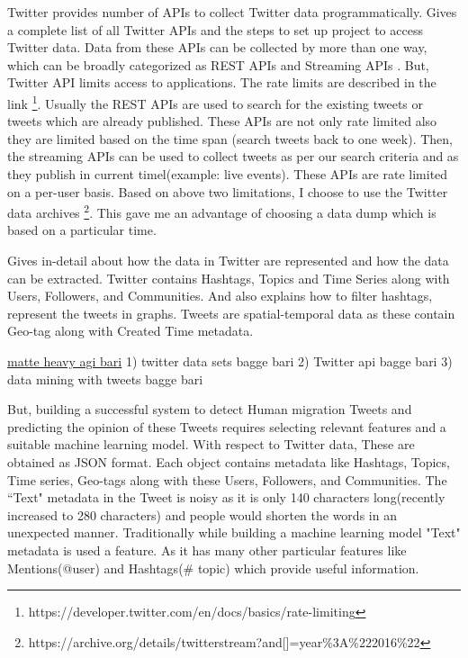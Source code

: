 Twitter provides number of APIs to collect Twitter data programmatically. \cite{TwitterDevDocs} Gives a complete list of all Twitter APIs and the steps to set up project to access Twitter data. Data from these APIs can be collected by more than one way, which can be broadly categorized as REST APIs and Streaming APIs . But, Twitter API limits access to applications. The rate limits are described in the link  \footnote{https://developer.twitter.com/en/docs/basics/rate-limiting}. Usually the REST APIs are used to search for the existing tweets or tweets which are already published. These APIs are not only rate limited also they are limited based on the time span (search tweets back to one week). Then, the streaming APIs can be used to collect tweets as per our search criteria and as they publish in current timel(example: live events). These APIs are rate limited on a per-user basis. Based on above two limitations, I choose to use the Twitter data archives \footnote{https://archive.org/details/twitterstream?and[]=year\%3A\%222016\%22}. This gave me an advantage of choosing a data dump which is based on a particular time.   



\cite{Marco} Gives in-detail about how the data in Twitter are represented
and how the data can be extracted. Twitter contains Hashtags, Topics and Time Series along with
Users, Followers, and Communities. And  \cite{Marco} also explains how to filter hashtags, represent the
tweets in graphs. Tweets are spatial-temporal data as these contain Geo-tag along with Created
Time metadata.

\underline{matte heavy agi bari}
1) twitter data sets bagge bari
2) Twitter api bagge bari
3) data mining with tweets bagge bari


 But, building a successful system to detect Human migration Tweets and predicting the opinion of these Tweets requires selecting relevant features and a suitable machine learning model. With respect to Twitter data, These are obtained as JSON format. Each object contains metadata like Hashtags, Topics, Time series, Geo-tags along with these Users, Followers, and Communities. The ``Text" metadata in the Tweet is noisy as it is only 140 characters long(recently increased to 280 characters) and people would shorten the words in an unexpected manner. Traditionally while building a machine learning model "Text" metadata is used a feature. As it has many other particular features like Mentions(@user) and Hashtags(\# topic) which provide useful information.
 
